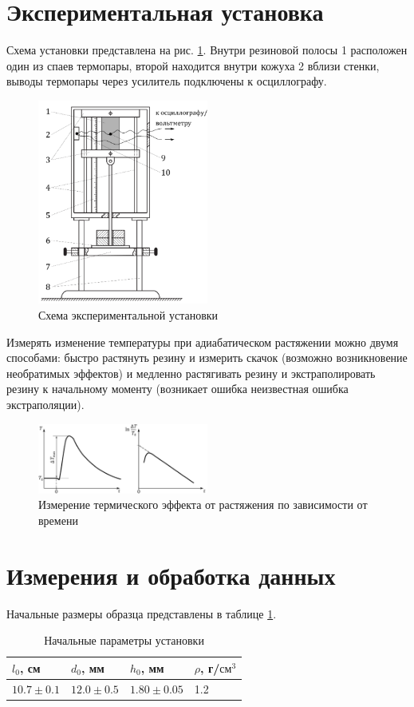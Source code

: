 \documentclass[a4paper,12pt]{article} %
\begin{document}
\section{Экспериментальная установка}
Схема установки представлена на рис. \ref{установка}. Внутри резиновой полосы 1 расположен один из спаев термопары, второй находится внутри кожуха 2 вблизи стенки, выводы термопары через усилитель подключены к осциллографу.
\begin{figure}[h!]
\begin{center}
\includegraphics[width=0.5\textwidth]{Установка}
\end{center}
\caption{Схема экспериментальной установки} \label{установка}
\end{figure}
Измерять изменение температуры при адиабатическом растяжении можно двумя способами: быстро растянуть резину и измерить скачок (возможно возникновение необратимых эффектов) и медленно растягивать резину и экстраполировать резину к начальному моменту (возникает ошибка неизвестная ошибка экстраполяции).
\begin{figure}[h!]
\begin{center}
\includegraphics[width=0.5\textwidth]{Измерение}
\end{center}
\caption{Измерение термического эффекта от растяжения по зависимости от времени} \label{измерение}
\end{figure}
\newpage
\section{Измерения и обработка данных}
Начальные размеры образца представлены в таблице \ref{база}.
\begin{table}[h!]
\caption{Начальные параметры установки} \label{база}
\begin{tabular}{|l|l|l|l|}
\hline
$l_0$, см      & $d_0$, мм      & $h_0$, мм       & $\rho$, г/$см^3$ \\ \hline
$10.7 \pm 0.1$ & $12.0 \pm 0.5$ & $1.80 \pm 0.05$ & 1.2              \\ \hline
\end{tabular}
\end{table}
\end{document}
